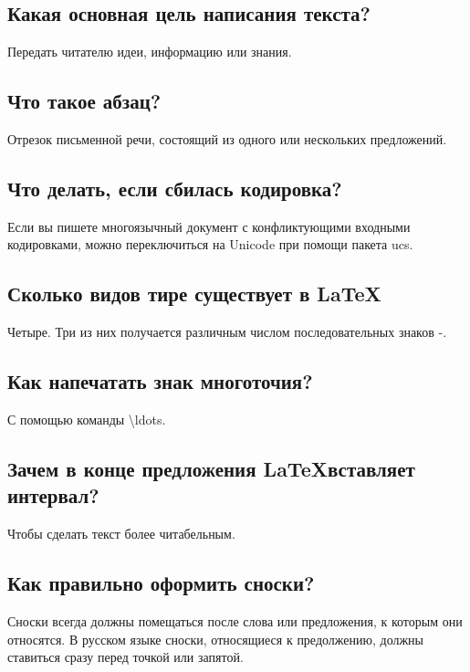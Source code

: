 \documentclass[a4paper,12pt]{article} %
\begin{document}
\subsection{Какая основная цель написания текста?}

Передать читателю идеи, информацию или знания.

\subsection{Что такое абзац?}

Отрезок письменной речи, состоящий из одного или нескольких предложений.

\subsection{Что делать, если сбилась кодировка?}

Если вы пишете многоязычный документ с конфликтующими входными кодировками, можно переключиться на Unicode при помощи пакета ucs.

\subsection{Сколько видов тире существует в \LaTeX}

Четыре. Три из них получается различным числом последовательных знаков -.

\subsection{Как напечатать знак многоточия?}

С помощью команды \textbackslash ldots.

\subsection{Зачем в конце предложения \LaTeX вставляет интервал?}

Чтобы сделать текст более читабельным.

\subsection{Как правильно оформить сноски?}

Сноски всегда должны помещаться после слова или предложения, к которым они относятся. В русском языке сноски, относящиеся к предолжению, должны ставиться сразу перед точкой или запятой.
\end{document}
